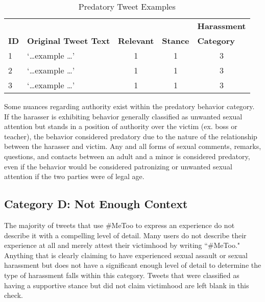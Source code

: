\begin{table}[H]
    \centering
    \caption{Predatory Tweet Examples}
    \begin{tabular}{m{1cm} m{8cm} m{1.5cm} m{1.1cm} m{2.1cm}}
        \toprule
        & {} & {} & {} & {\textbf{Harassment}} \\
        \rowcolor{White}\textbf{ID} & {\textbf{Original Tweet Text}} & {\textbf{Relevant}} & {\textbf{Stance}} & {\textbf{Category}} \\
                \midrule
        1 & `\ldots example \ldots' & \multicolumn{1}{c}{1} & \multicolumn{1}{c}{1} & \multicolumn{1}{c}{3}\\
        2 & `\ldots example \ldots' & \multicolumn{1}{c}{1} & \multicolumn{1}{c}{1} & \multicolumn{1}{c}{3}\\
        3 & `\ldots example \ldots' & \multicolumn{1}{c}{1} & \multicolumn{1}{c}{1} & \multicolumn{1}{c}{3}\\
        \bottomrule
    \end{tabular}
\end{table}

Some nuances regarding authority exist within the predatory behavior category. If the harasser is exhibiting behavior generally classified as unwanted sexual attention but stands in a position of authority over the victim (ex. boss or teacher), the behavior considered predatory due to the nature of the relationship between the harasser and victim. Any and all forms of sexual comments, remarks, questions, and contacts between an adult and a minor is considered predatory, even if the behavior would be considered patronizing or unwanted sexual attention if the two parties were of legal age.

\subsection{Category D: Not Enough Context}

The majority of tweets that use \#MeToo to express an experience do not describe it with a compelling level of detail. Many users do not describe their experience at all and merely attest their victimhood by writing ``\#MeToo." Anything that is clearly claiming to have experienced sexual assault or sexual harassment but does not have a significant enough level of detail to determine the type of harassment falls within this category. Tweets that were classified as having a supportive stance but did not claim victimhood are left blank in this check.

